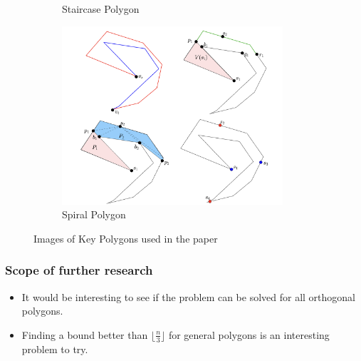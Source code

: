 \documentclass{Assignment}
\begin{document}
\begin{itemize}
\begin{figure}[H]
\begin{minipage}{0.45\textwidth}
\begin{subfigure}[b]{\textwidth}
                \caption{Staircase Polygon}
                \label{fig:staircase_polygon}
            \end{subfigure}
        \end{minipage}
        \hfill
        \begin{minipage}[t]{0.45\textwidth}
            \centering
            \begin{subfigure}[b]{\textwidth}
                \centering
                \includegraphics[width=0.9\textwidth]{images/spiral_polygon.png}
                \caption{Spiral Polygon}
                \label{fig:spiral_polygon}
            \end{subfigure}
        \end{minipage}
        \caption{Images of Key Polygons used in the paper}
    \end{figure}
\end{itemize}
\vspace{-0.8cm}
\subsubsection*{Scope of further research}
\vspace{-0.3cm}
\begin{itemize}
    \itemsep-0.3em
    \item It would be interesting to see if the problem can be solved for all orthogonal polygons.
    \item Finding a bound better than $\lfloor \frac n3 \rfloor$ for general polygons is an interesting problem to try.
\end{itemize}
\vspace{-0.7cm}
\end{document}
